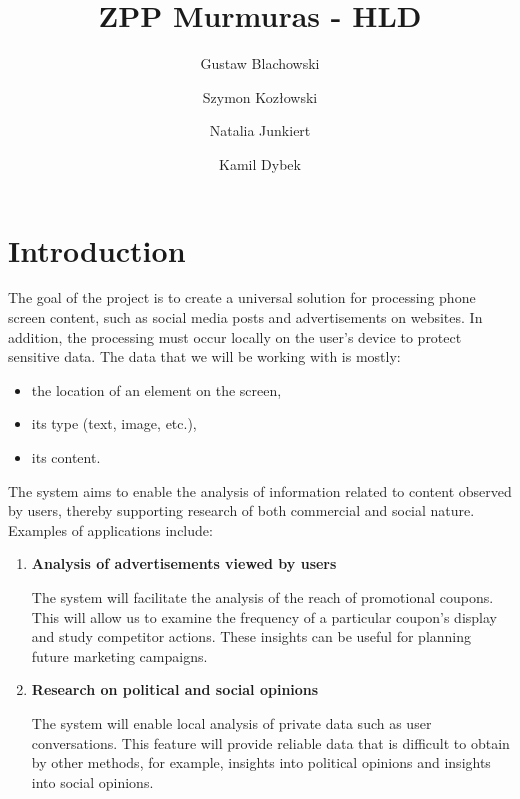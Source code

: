 \documentclass[12pt]{article}
\title{ZPP Murmuras - HLD}
\author{Gustaw Blachowski \and Szymon Kozłowski \and Natalia Junkiert \and Kamil Dybek}
\date{}
\begin{document}
\maketitle

\section*{Introduction}
The goal of the project is to create a universal solution for processing phone screen content, such as social media posts and advertisements on websites. In addition, the processing must occur locally on the user's device to protect sensitive data. The data that we will be working with is mostly:
\begin{itemize}
    \item the location of an element on the screen,
    \item its type (text, image, etc.),
    \item its content.
\end{itemize}

The system aims to enable the analysis of information related to content observed by users, thereby supporting research of both commercial and social nature. Examples of applications include:
\begin{enumerate}
    \item \textbf{Analysis of advertisements viewed by users}

    The system will facilitate the analysis of the reach of promotional coupons. This will allow us to examine the frequency of a particular coupon’s display and study competitor actions. These insights can be useful for planning future marketing campaigns.
    \item \textbf{Research on political and social opinions}

    The system will enable local analysis of private data such as user conversations. This feature will provide reliable data that is difficult to obtain by other methods, for example, insights into political opinions and insights into social opinions.
\end{enumerate}
\end{document}
